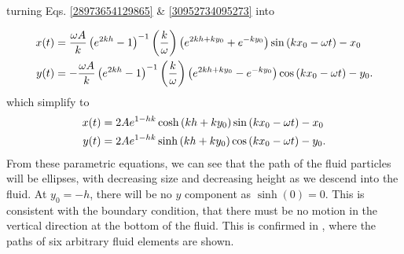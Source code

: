 \documentclass[12pt]{book}
\begin{document}
{


turning Eqs. \ref{28973654129865} \& \ref{30952734095273} into

\begin{align*}
x(t) &= \frac{\omega A}{k}\left(e^{2kh}-1\right)^{-1}\left(\frac{k}{\omega}\right)\left(e^{2kh+ky_0} + e^{-ky_0}\right)\sin\left(kx_0-\omega t\right) - x_0\\ 
y(t) &= -\frac{\omega A}{k}\left(e^{2kh}-1\right)^{-1}\left(\frac{k}{\omega}\right)\left(e^{2kh+ky_0} - e^{-ky_0}\right)\cos\left(kx_0-\omega t\right) - y_0.
\end{align*}
which simplify to
\begin{align}
x(t) &= 2Ae^{1-hk} \cosh \left(kh+ky_0\right) \sin\left(kx_0-\omega t\right) - x_0\\
y(t) &= 2Ae^{1-hk} \sinh \left(kh+ky_0\right) \cos\left(kx_0-\omega t\right) - y_0.
\end{align}
From these parametric equations, we can see that the path of the fluid particles will be ellipses, with decreasing size and decreasing height as we descend into the fluid.  At \mbox{$y_0 = -h$}, there will be no $y$ component as $\sinh(0) = 0$.  This is consistent with the boundary condition, that there must be no motion in the vertical direction at the bottom of the fluid.  This is confirmed in , where the paths of six arbitrary fluid elements are shown.

}
\end{document}
